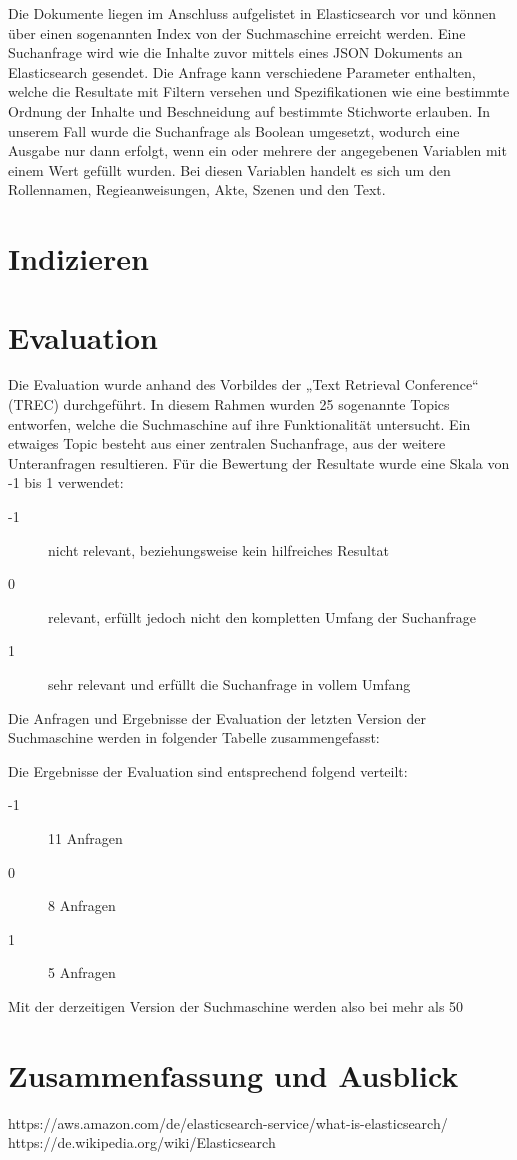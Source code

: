 Die Dokumente liegen im Anschluss aufgelistet in Elasticsearch vor und können über einen sogenannten Index von der Suchmaschine erreicht werden. Eine Suchanfrage wird wie die Inhalte zuvor mittels eines JSON Dokuments an Elasticsearch gesendet. Die Anfrage kann verschiedene Parameter enthalten, welche die Resultate mit Filtern versehen und Spezifikationen wie eine bestimmte Ordnung der Inhalte und Beschneidung auf bestimmte Stichworte erlauben. In unserem Fall wurde die Suchanfrage als Boolean umgesetzt, wodurch eine Ausgabe nur dann erfolgt, wenn ein oder mehrere der angegebenen Variablen mit einem Wert gefüllt wurden. Bei diesen Variablen handelt es sich um den Rollennamen, Regieanweisungen, Akte, Szenen und den Text.

\section{Indizieren}

\section{Evaluation}
Die Evaluation wurde anhand des Vorbildes der „Text Retrieval Conference“ (TREC) durchgeführt. In diesem Rahmen wurden 25 sogenannte Topics entworfen, welche die Suchmaschine auf ihre Funktionalität untersucht. Ein etwaiges Topic besteht aus einer zentralen Suchanfrage, aus der weitere Unteranfragen resultieren. Für die Bewertung der Resultate wurde eine Skala von -1 bis 1 verwendet:
\begin{description}
    \item[-1] nicht relevant, beziehungsweise kein hilfreiches Resultat
    \item[0] relevant, erfüllt jedoch nicht den kompletten Umfang der Suchanfrage
    \item[1] sehr relevant und erfüllt die Suchanfrage in vollem Umfang
\end{description}
Die Anfragen und Ergebnisse der Evaluation der letzten Version der Suchmaschine werden in folgender Tabelle zusammengefasst:

Die Ergebnisse der Evaluation sind entsprechend folgend verteilt:
\begin{description}
    \item[-1] 11 Anfragen
    \item[0] 8 Anfragen
    \item[1] 5 Anfragen
\end{description}

Mit der derzeitigen Version der Suchmaschine werden also bei mehr als 50%

\section{Zusammenfassung und Ausblick}
https://aws.amazon.com/de/elasticsearch-service/what-is-elasticsearch/
https://de.wikipedia.org/wiki/Elasticsearch
